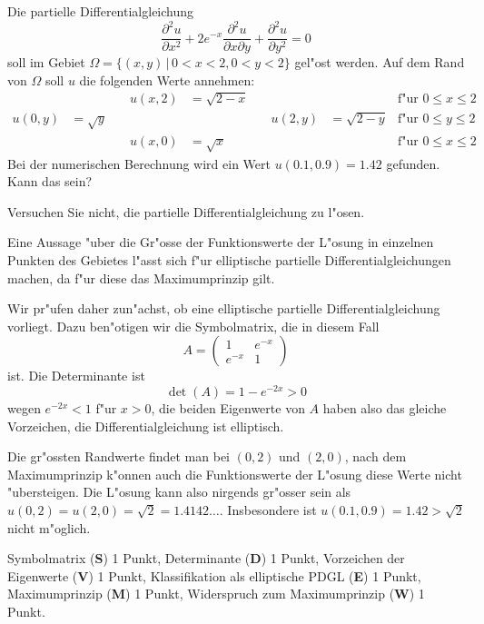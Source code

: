 Die partielle Differentialgleichung
\[
\frac{\partial^2 u}{\partial x^2}
+
2e^{-x}
\frac{\partial^2 u}{\partial x\partial y}
+
\frac{\partial^2 u}{\partial y^2}
=
0
\]
soll im Gebiet $\Omega=\{(x,y)\,|\, 0<x<2, 0<y<2\}$ gel"ost werden.
Auf dem Rand von $\Omega$ soll $u$ die folgenden Werte annehmen:
\begin{align*}
      &    &\quad u(x,2)&=\sqrt{2-x}&\quad       &        &\text{f"ur $0\le x\le 2$}\\
u(0,y)&=\sqrt{y}&\quad       &        &\quad u(2,y)&=\sqrt{2-y}&\text{f"ur $0\le y\le 2$}\\
      &    &\quad u(x,0)&=\sqrt{x}    &\quad       &        &\text{f"ur $0\le x\le 2$}
\end{align*}
Bei der numerischen Berechnung wird ein Wert $u(0.1,0.9)=1.42$ gefunden.
Kann das sein?

\begin{hinweis}
Versuchen Sie nicht, die partielle Differentialgleichung zu l"osen.
\end{hinweis}

\begin{loesung}
Eine Aussage "uber die Gr"osse der Funktionswerte der L"osung in
einzelnen Punkten des Gebietes l"asst sich f"ur elliptische
partielle Differentialgleichungen machen, da f"ur diese das Maximumprinzip
gilt.

Wir pr"ufen daher zun"achst, ob eine elliptische partielle
Differentialgleichung vorliegt. Dazu ben"otigen wir die Symbolmatrix,
die in diesem Fall
\[
A=\begin{pmatrix}
1&e^{-x}\\
e^{-x}&1
\end{pmatrix}
\]
ist. Die Determinante ist
\[
\det(A)=1-e^{-2x}>0
\]
wegen
$e^{-2x}<1$
f"ur $x>0$, die beiden Eigenwerte von $A$ haben also das gleiche Vorzeichen,
die Differentialgleichung ist elliptisch.

Die gr"ossten Randwerte findet man bei $(0,2)$ und $(2,0)$, nach dem
Maximumprinzip
k"onnen auch die Funktionswerte der L"osung diese Werte nicht "ubersteigen.
Die L"osung kann also nirgends gr"osser sein als
$u(0,2)=u(2,0)=\sqrt{2}=1.4142\dots$.
Insbesondere ist $u(0.1,0.9)=1.42>\sqrt{2}$ nicht m"oglich.
\end{loesung}

\begin{bewertung}
Symbolmatrix ({\bf S}) 1 Punkt,
Determinante ({\bf D}) 1 Punkt,
Vorzeichen der Eigenwerte ({\bf V}) 1 Punkt,
Klassifikation als elliptische PDGL ({\bf E}) 1 Punkt,
Maximumprinzip ({\bf M}) 1 Punkt,
Widerspruch zum Maximumprinzip ({\bf W}) 1 Punkt.
\end{bewertung}

